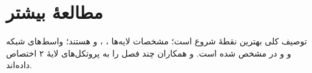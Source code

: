 \documentclass[11pt,a4paper]{article}
\begin{document}
\section{مطالعهٔ بیشتر}
توصیف کلی  \cite{ts36300} بهترین نقطهٔ شروع است؛ مشخصات لایه‌ها  \cite{ts36321}، 
\cite{ts36322}،  \cite{ts36323} و  \cite{ts36331} هستند؛ واسط‌های شبکه  \cite{ts36413}
و  \cite{ts36423} و  در \cite{rfc9260} مشخص شده است.  و همکاران
\cite{sesia2011lte} چند فصل را به پروتکل‌های لایهٔ ۲ اختصاص داده‌اند.

\begin{latin}
\printbibliography[heading=subbibliography,title={References}]
\end{latin}
\end{document}
